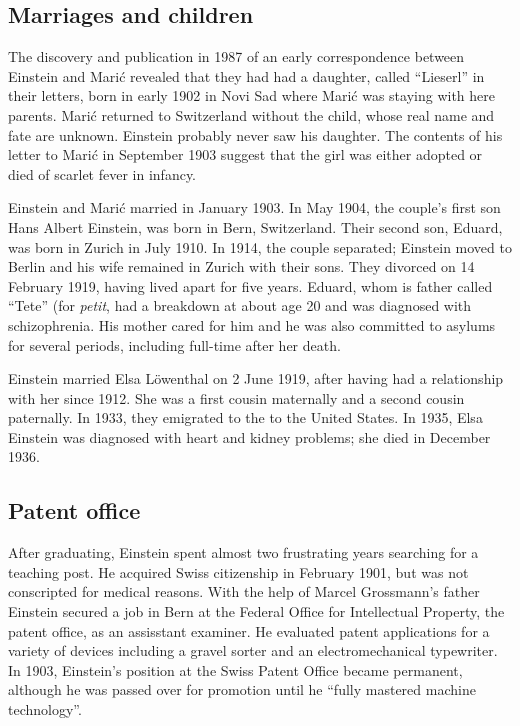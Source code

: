 \documentclass[titlepage]{article}
\begin{document}
\subsection{Marriages and children}

The discovery and publication in 1987 of an early correspondence between
Einstein and Mari\'{c} revealed that they had had a daughter, called
``Lieserl'' in their letters, born in early 1902 in Novi Sad where
Mari\'{c} was staying with here parents. Mari\'{c} returned to
Switzerland without the child, whose real name and fate are unknown.
Einstein probably never saw his daughter. The contents of his letter
to Mari\'{c} in September 1903 suggest that the girl was either adopted
or died of scarlet fever in infancy.

Einstein and Mari\'{c} married in January 1903. In May 1904, the couple's
first son Hans Albert Einstein, was born in Bern, Switzerland. Their
second son, Eduard, was born in Zurich in July 1910. In 1914, the couple
separated; Einstein moved to Berlin and his wife remained in Zurich
with their sons. They divorced on 14 February 1919, having lived apart
for five years. Eduard, whom is father called ``Tete'' (for \emph{petit},
had a breakdown at about age 20 and was diagnosed with schizophrenia. His
mother cared for him and he was also committed to asylums for several
periods, including full-time after her death.

Einstein married Elsa L\"{o}wenthal on 2 June 1919, after having had
a relationship with her since 1912. She was a first cousin maternally
and a second cousin paternally. In 1933, they emigrated to the to the
United States. In 1935, Elsa Einstein was diagnosed with heart and 
kidney problems; she died in December 1936.

\subsection{Patent office}

After graduating, Einstein spent almost two frustrating years searching
for a teaching post. He acquired Swiss citizenship in February 1901,
but was not conscripted for medical reasons. With the help of Marcel
Grossmann's father Einstein secured a job in Bern at the Federal Office
for Intellectual Property, the patent office, as an assisstant examiner.
He evaluated patent applications for a variety of devices including
a gravel sorter and an electromechanical typewriter. In 1903, Einstein's
position at the Swiss Patent Office became permanent, although he
was passed over for promotion until he ``fully mastered machine
technology''.
\end{document}
